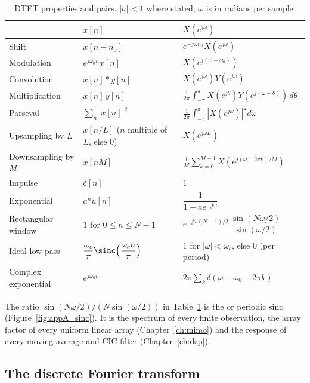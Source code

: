 \begin{table}[htbp]\centering\small
\caption{DTFT properties and pairs. $|a|<1$ where stated; $\omega$ is in radians per sample.}\label{tab:appA:dtft}
\begin{tabular}{@{}lll@{}}
\toprule
 & $x[n]$ & $X(e^{j\omega})$\\
\midrule
Shift & $x[n-n_0]$ & $e^{-j\omega n_0}X(e^{j\omega})$\\
Modulation & $e^{j\omega_0n}x[n]$ & $X(e^{j(\omega-\omega_0)})$\\
Convolution & $x[n]*y[n]$ & $X(e^{j\omega})Y(e^{j\omega})$\\
Multiplication & $x[n]\,y[n]$ & $\frac1{2\pi}\int_{-\pi}^{\pi}X(e^{j\theta})Y(e^{j(\omega-\theta)})\,d\theta$\\
Parseval & $\sum_n|x[n]|^2$ & $\frac1{2\pi}\int_{-\pi}^{\pi}|X(e^{j\omega})|^2d\omega$\\
Upsampling by $L$ & $x[n/L]$ ($n$ multiple of $L$, else 0) & $X(e^{j\omega L})$\\
Downsampling by $M$ & $x[nM]$ & $\frac1M\sum_{k=0}^{M-1}X(e^{j(\omega-2\pi k)/M})$\\
\midrule
Impulse & $\delta[n]$ & $1$\\
Exponential & $a^n u[n]$ & $\dfrac{1}{1-ae^{-j\omega}}$\\
Rectangular window & $1$ for $0\le n\le N-1$ & $e^{-j\omega(N-1)/2}\,\dfrac{\sin(N\omega/2)}{\sin(\omega/2)}$\\
Ideal low-pass & $\dfrac{\omega_c}{\pi}\sinc\!\left(\dfrac{\omega_c n}{\pi}\right)$ & $1$ for $|\omega|<\omega_c$, else 0 (per period)\\
Complex exponential & $e^{j\omega_0 n}$ & $2\pi\sum_k\delta(\omega-\omega_0-2\pi k)$\\
\bottomrule
\end{tabular}
\end{table}

The ratio $\sin(N\omega/2)/(N\sin(\omega/2))$ in Table~\ref{tab:appA:dtft} is the
 or periodic sinc (Figure~\ref{fig:appA_sinc}). It is the spectrum of every
finite observation, the array factor of every uniform linear array (Chapter~\ref{ch:mimo}) and the
response of every moving-average and CIC filter (Chapter~\ref{ch:dsp}).

\subsection{The discrete Fourier transform}

